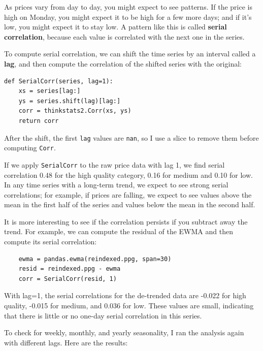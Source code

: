 \documentclass[12pt]{book}
\begin{document}
As prices vary from day to day, you might expect to see patterns.
If the price is high on Monday,
you might expect it to be high for a few more days; and
if it's low, you might expect it to stay low.  A pattern
like this is called {\bf serial
correlation}, because each value is correlated with the next one
in the series.

To compute serial correlation, we can shift the time series
by an interval called a {\bf lag}, and then compute the correlation
of the shifted series with the original:

\begin{verbatim}
def SerialCorr(series, lag=1):
    xs = series[lag:]
    ys = series.shift(lag)[lag:]
    corr = thinkstats2.Corr(xs, ys)
    return corr
\end{verbatim}

After the shift, the first \verb"lag" values are \verb"nan", so
I use a slice to remove them before computing \verb"Corr".


If we apply \verb"SerialCorr" to the raw price data with lag 1, we find
serial correlation 0.48 for the high quality category, 0.16 for
medium and 0.10 for low.  In any time series with a long-term trend,
we expect to see strong serial correlations; for example, if prices
are falling, we expect to see values above the mean in the first
half of the series and values below the mean in the second half.

It is more interesting to see if the correlation persists if you
subtract away the trend.  For example, we can compute the residual
of the EWMA and then compute its serial correlation:

\begin{verbatim}
    ewma = pandas.ewma(reindexed.ppg, span=30)
    resid = reindexed.ppg - ewma
    corr = SerialCorr(resid, 1)
\end{verbatim}

With lag=1, the serial correlations for the de-trended data are
-0.022 for high quality, -0.015 for medium, and 0.036 for low.
These values are small, indicating that there is little or
no one-day serial correlation in this series.

To check for weekly, monthly, and yearly seasonality, I ran
the analysis again with different lags.  Here are the results:
\end{document}
